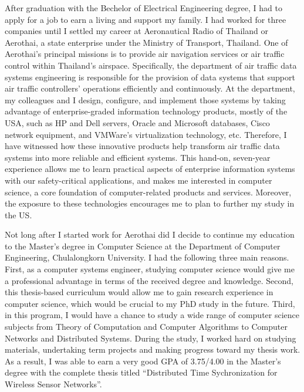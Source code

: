\documentclass[a4paper,10pt]{report}
\begin{document}
\vspace{0.2cm}
After graduation with the Bechelor of Electrical Engineering degree, I had to apply for a job to earn a living and support my family. I had worked for three companies until I settled my career at Aeronautical Radio of Thailand or Aerothai, a state enterprise under the Ministry of Transport, Thailand. One of Aerothai's principal missions is to provide air navigation services or air traffic control within Thailand's airspace. Specifically, the department of air traffic data systems engineering is responsible for the provision of data systems that support air traffic controllers' operations efficiently and continuously. At the department, my colleagues and I design, configure, and implement those systems by taking advantage of enterprise-graded information technology products, mostly of the USA, such as HP and Dell servers, Oracle and Microsoft databases, Cisco network equipment, and VMWare's virtualization technology, etc. Therefore, I have witnessed how these innovative products help transform air traffic data systems into more reliable and efficient systems. This hand-on, seven-year experience allows me to learn practical aspects of enterprise information systems with our safety-critical applications, and makes me interested in computer science, a core foundation of computer-related products and services. Moreover, the exposure to these technologies encourages me to plan to further my study in the US.

\vspace{0.2cm}
Not long after I started work for Aerothai did I decide to continue my education to the Master's degree in Computer Science at the Department of Computer Engineering, Chulalongkorn University. I had the following three main reasons. First, as a computer systems engineer, studying computer science would give me a professional advantage in terms of the received degree and knowledge. Second, this thesis-based curriculum would allow me to gain research experience in computer science, which would be crucial to my PhD study in the future. Third, in this program, I would have a chance to study a wide range of computer science subjects from Theory of Computation and Computer Algorithms to Computer Networks and Distributed Systems. During the study, I worked hard on studying materials, undertaking term projects and making progress toward my thesis work. As a result, I was able to earn a very good GPA of 3.75/4.00 in the Master's degree with the complete thesis titled ``Distributed Time Sychronization for Wireless Sensor Networks''.
\end{document}
